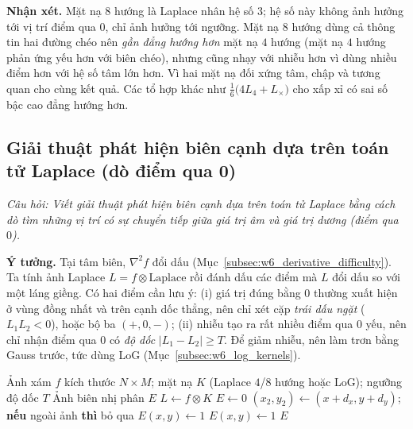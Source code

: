 \textbf{Nhận xét.} Mặt nạ $8$ hướng là Laplace nhân hệ số $3$; hệ số này không ảnh hưởng tới vị trí điểm qua $0$, chỉ ảnh hưởng tới ngưỡng. Mặt nạ $8$ hướng dùng cả thông tin hai đường chéo nên \emph{gần đẳng hướng hơn} mặt nạ $4$ hướng (mặt nạ $4$ hướng phản ứng yếu hơn với biên chéo), nhưng cũng nhạy với nhiễu hơn vì dùng nhiều điểm hơn với hệ số tâm lớn hơn. Vì hai mặt nạ đối xứng tâm, chập và tương quan cho cùng kết quả. Các tổ hợp khác như $\frac{1}{6}\big(4 L_4 + L_\times\big)$ cho xấp xỉ có sai số bậc cao đẳng hướng hơn.

\subsection{Giải thuật phát hiện biên cạnh dựa trên toán tử Laplace (dò điểm qua 0)}
\label{subsec:w6_laplace_algorithm}

\textit{Câu hỏi: Viết giải thuật phát hiện biên cạnh dựa trên toán tử Laplace bằng cách dò tìm những vị trí có sự chuyển tiếp giữa giá trị âm và giá trị dương (điểm qua $0$).}

\textbf{Ý tưởng.} Tại tâm biên, $\nabla^2 f$ đổi dấu (Mục~\ref{subsec:w6_derivative_difficulty}). Ta tính ảnh Laplace $L = f \otimes \text{Laplace}$ rồi đánh dấu các điểm mà $L$ đổi dấu so với một láng giềng. Có hai điểm cần lưu ý: (i) giá trị đúng bằng $0$ thường xuất hiện ở vùng đồng nhất và trên cạnh dốc thẳng, nên chỉ xét cặp \emph{trái dấu ngặt} ($L_1 L_2 < 0$), hoặc bộ ba $(+, 0, -)$; (ii) nhiễu tạo ra rất nhiều điểm qua $0$ yếu, nên chỉ nhận điểm qua $0$ có \emph{độ dốc} $|L_1 - L_2| \ge T$. Để giảm nhiễu, nên làm trơn bằng Gauss trước, tức dùng LoG (Mục~\ref{subsec:w6_log_kernels}).

\begin{algorithm}[ht]
\caption{Phát hiện biên bằng điểm qua $0$ của Laplace / LoG}
\label{alg:w6_zero_crossing}
\begin{algorithmic}[1]
\Require Ảnh xám $f$ kích thước $N \times M$; mặt nạ $K$ (Laplace $4$/$8$ hướng hoặc LoG); ngưỡng độ dốc $T$
\Ensure Ảnh biên nhị phân $E$
\State $L \gets f \otimes K$ 
\State $E \gets 0$
         
            \State $(x_2, y_2) \gets (x + d_x, y + d_y)$; \textbf{nếu} ngoài ảnh \textbf{thì} bỏ qua
                \State $E(x, y) \gets 1$ 
            \EndIf
        \EndFor
            \State $E(x, y) \gets 1$ 
        \EndIf
    \EndFor
\EndFor
\State \Return $E$
\end{algorithmic}
\end{algorithm}

